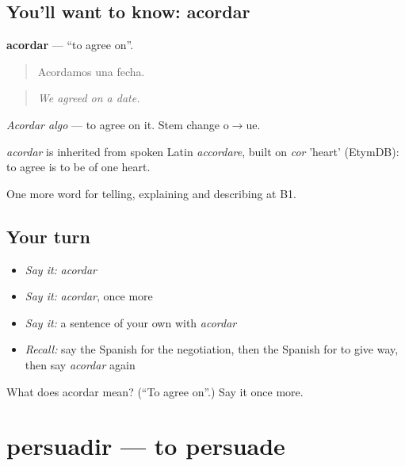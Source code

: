 \subsection*{You'll want to know: acordar}
\textbf{acordar} — \textquotedblleft{}to agree on\textquotedblright{}.

\begin{quote}
Acordamos una fecha.
\end{quote}

\begin{quote}
\emph{We agreed on a date.}
\end{quote}

\emph{Acordar algo} — to agree on it. Stem change o$\to$ue.

\begin{cousinweb}
\emph{acordar} is inherited from spoken Latin \emph{accordare}, built on \emph{cor} 'heart' (EtymDB): to agree is to be of one heart.
\end{cousinweb}

\begin{grammarlens}[title={What you've built}]
One more word for telling, explaining and describing at B1.
\end{grammarlens}

\subsection*{Your turn}
\begin{itemize}
\raggedright
  \item \emph{Say it:} \emph{acordar}
  \item \emph{Say it:} \emph{acordar}, once more
  \item \emph{Say it:} a sentence of your own with \emph{acordar}
  \item \emph{Recall:} say the Spanish for the negotiation, then the Spanish for to give way, then say \emph{acordar} again
\end{itemize}

\begin{tcolorbox}[breakable,colback=teal!4,colframe=teal!35!black,title={Before you move on}]
What does acordar mean? (\textquotedblleft{}To agree on\textquotedblright{}.) Say it once more.
\end{tcolorbox}
\section[persuadir]{persuadir — to persuade}

